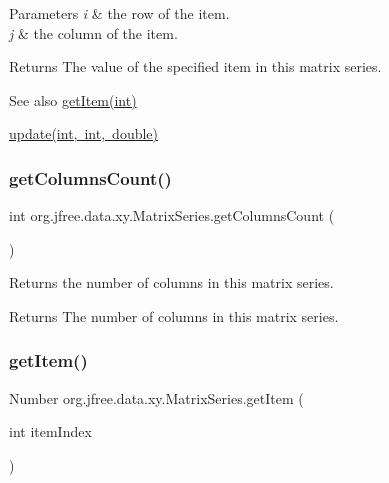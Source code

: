 \begin{DoxyParams}{Parameters}
{\em i} & the row of the item. \\
\hline
{\em j} & the column of the item.\\
\hline
\end{DoxyParams}
\begin{DoxyReturn}{Returns}
The value of the specified item in this matrix series.
\end{DoxyReturn}
\begin{DoxySeeAlso}{See also}
\mbox{\hyperlink{classorg_1_1jfree_1_1data_1_1xy_1_1_matrix_series_ad77ed9610997bea1f37b95a3ecaf238a}{get\+Item(int)}} 

\mbox{\hyperlink{classorg_1_1jfree_1_1data_1_1xy_1_1_matrix_series_ab37bc40ca0ac68127fdb1b61b08937c6}{update(int, int, double)}} 
\end{DoxySeeAlso}
\mbox{\label{classorg_1_1jfree_1_1data_1_1xy_1_1_matrix_series_ad4416aec274e384b9043e899ea4c68b0}} 
\subsubsection{\texorpdfstring{get\+Columns\+Count()}{getColumnsCount()}}
{\footnotesize\ttfamily int org.\+jfree.\+data.\+xy.\+Matrix\+Series.\+get\+Columns\+Count (\begin{DoxyParamCaption}{ }\end{DoxyParamCaption})}

Returns the number of columns in this matrix series.

\begin{DoxyReturn}{Returns}
The number of columns in this matrix series. 
\end{DoxyReturn}
\mbox{\label{classorg_1_1jfree_1_1data_1_1xy_1_1_matrix_series_ad77ed9610997bea1f37b95a3ecaf238a}} 
\subsubsection{\texorpdfstring{get\+Item()}{getItem()}}
{\footnotesize\ttfamily Number org.\+jfree.\+data.\+xy.\+Matrix\+Series.\+get\+Item (\begin{DoxyParamCaption}\item[{int}]{item\+Index }\end{DoxyParamCaption})}

